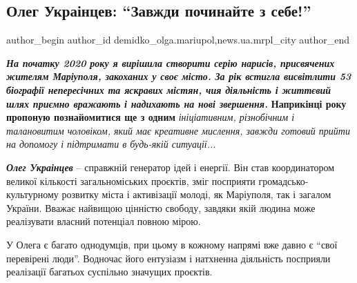 
 
 
 
 
 
\subsection{Олег Украінцев: \enquote{Завжди починайте з себе!}}
\label{sec:10_12_2020.stz.news.ua.mrpl_city.1.oleg_ukraincev_zavzhdy_pochynajte_z_sebe}
 
\ifcmt
 author_begin
   author_id demidko_olga.mariupol,news.ua.mrpl_city
 author_end
\fi

\emph{\textbf{На початку 2020 року я вирішила створити серію нарисів,
присвячених жителям Маріуполя, закоханих у своє місто. За рік встигла
висвітлити 53 біографії непересічних та яскравих містян, чия діяльність і
життєвий шлях приємно вражають і надихають на нові звершення.}} \textbf{Наприкінці року
пропоную познайомитися ще з одним} \emph{ініціативним, різнобічним і талановитим
чоловіком, який має креативне мислення, завжди готовий прийти на допомогу і
підтримати в будь-якій ситуації...}\par\emph{\textbf{Олег Украінцев}} – справжній генератор ідей
і енергії. Він став координатором великої кількості загальноміських проєктів,
зміг посприяти громадсько-культурному розвитку міста і активізації молоді, як
Маріуполя, так і загалом України. Вважає найвищою цінністю свободу, завдяки
якій людина може реалізувати власний потенціал повною мірою.

У Олега є багато однодумців, при цьому в кожному напрямі вже давно є \enquote{свої
перевірені люди}. Водночас його ентузіазм і натхненна діяльність посприяли
реалізації багатьох суспільно значущих проєктів.


